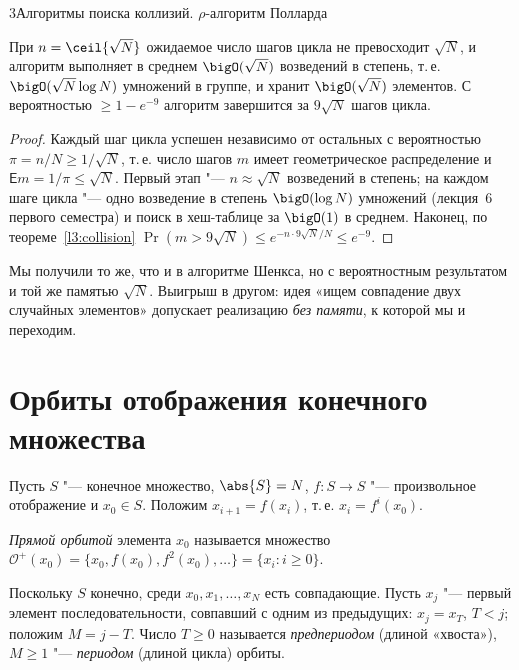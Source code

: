 \begin{lecture}{3}{Алгоритмы поиска коллизий. \texorpdfstring{$\rho$}{ρ}-алгоритм Полларда}
\begin{theorem}\label{l3:collision-dlp}
При $n = \ceil{\sqrt N}$ ожидаемое число шагов цикла не превосходит $\sqrt N$, и алгоритм
выполняет в среднем $\bigO(\sqrt N)$ возведений в степень, т.\,е. $\bigO(\sqrt N \log N)$
умножений в группе, и хранит $\bigO(\sqrt N)$ элементов. С вероятностью $\ge 1 - e^{-9}$
алгоритм завершится за $9\sqrt N$ шагов цикла.
\end{theorem}

\begin{proof}
Каждый шаг цикла успешен независимо от остальных с вероятностью $\pi = n/N \ge 1/\sqrt N$,
т.\,е. число шагов $m$ имеет геометрическое распределение и
$\mathsf{E} m = 1/\pi \le \sqrt N$. Первый этап "--- $n \approx \sqrt N$ возведений
в степень; на каждом шаге цикла "--- одно возведение в степень $\bigO(\log N)$ умножений
(лекция~6 первого семестра) и поиск в хеш-таблице за $\bigO(1)$ в среднем. Наконец, по
теореме~\ref{l3:collision} $\Pr(m > 9\sqrt N) \le e^{-n \cdot 9\sqrt N/N} \le e^{-9}$.
\end{proof}

Мы получили то же, что и в алгоритме Шенкса, но с вероятностным результатом и той же
памятью $\sqrt N$. Выигрыш в другом: идея «ищем совпадение двух случайных элементов» допускает
реализацию \emph{без памяти}, к которой мы и переходим.



\section{Орбиты отображения конечного множества}

Пусть $S$ "--- конечное множество, $\abs{S} = N$, $f\colon S \to S$ "--- произвольное
отображение и $x_0 \in S$. Положим $x_{i+1} = f(x_i)$, т.\,е. $x_i = f^{i}(x_0)$.

\begin{definition}
\emph{Прямой орбитой} элемента $x_0$ называется множество
$\mathcal{O}^+(x_0) = \{x_0, f(x_0), f^2(x_0), \dots\} = \{x_i : i \ge 0\}$.
\end{definition}

Поскольку $S$ конечно, среди $x_0, x_1, \dots, x_N$ есть совпадающие. Пусть $x_j$ "--- первый
элемент последовательности, совпавший с одним из предыдущих: $x_j = x_T$, $T < j$; положим
$M = j - T$. Число $T \ge 0$ называется \emph{предпериодом} (длиной «хвоста»), $M \ge 1$
"--- \emph{периодом} (длиной цикла) орбиты.


\end{lecture}
